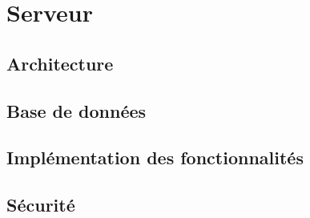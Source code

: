 \section{Serveur}
\label{sec:server}

\subsection{Architecture}
\subsection{Base de données}
\subsection{Implémentation des fonctionnalités}
\subsection{Sécurité}
